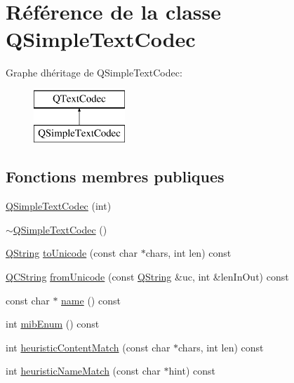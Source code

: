 \hypertarget{class_q_simple_text_codec}{}\section{Référence de la classe Q\+Simple\+Text\+Codec}
\label{class_q_simple_text_codec}
Graphe d\textquotesingle{}héritage de Q\+Simple\+Text\+Codec\+:\begin{figure}[H]
\begin{center}
\leavevmode
\includegraphics[height=2.000000cm]{class_q_simple_text_codec}
\end{center}
\end{figure}
\subsection*{Fonctions membres publiques}
\begin{DoxyCompactItemize}
\item 
\hyperlink{class_q_simple_text_codec_a07b6ee6fd1488a57dfcff5e4428d841b}{Q\+Simple\+Text\+Codec} (int)
\item 
\hyperlink{class_q_simple_text_codec_a4dda1d5234c53e36d91d75c771dd8549}{$\sim$\+Q\+Simple\+Text\+Codec} ()
\item 
\hyperlink{class_q_string}{Q\+String} \hyperlink{class_q_simple_text_codec_a78af84492d303c1c656c7dc1fefbc32e}{to\+Unicode} (const char $\ast$chars, int len) const 
\item 
\hyperlink{class_q_c_string}{Q\+C\+String} \hyperlink{class_q_simple_text_codec_a62f2bcade4fe6e62582761ee3f56fb0d}{from\+Unicode} (const \hyperlink{class_q_string}{Q\+String} \&uc, int \&len\+In\+Out) const 
\item 
const char $\ast$ \hyperlink{class_q_simple_text_codec_aa4b6fa5138bcaef3d5a71ca3149aa399}{name} () const 
\item 
int \hyperlink{class_q_simple_text_codec_a9ba392ae50ea84aa86dca0894430e51d}{mib\+Enum} () const 
\item 
int \hyperlink{class_q_simple_text_codec_ad8c6f3d9fd0e4c9404afca77bba3a885}{heuristic\+Content\+Match} (const char $\ast$chars, int len) const 
\item 
int \hyperlink{class_q_simple_text_codec_a112fb37fe73e59cfd20d43e9b958a722}{heuristic\+Name\+Match} (const char $\ast$hint) const 
\end{DoxyCompactItemize}
